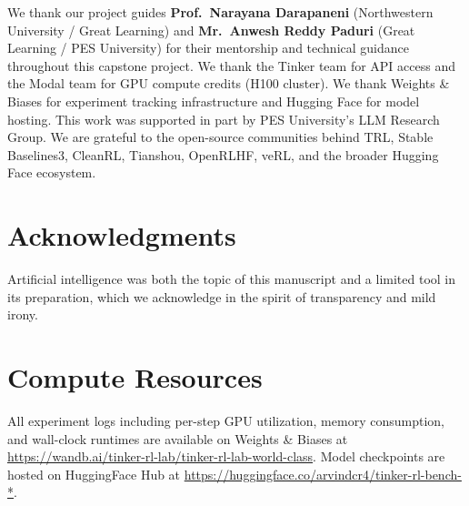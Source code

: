 \documentclass{article}
\begin{document}




\begin{ack}
\label{sec:acknowledgments}
We thank our project guides \textbf{Prof.~Narayana Darapaneni}
(Northwestern University / Great Learning) and
\textbf{Mr.~Anwesh Reddy Paduri} (Great Learning / PES University)
for their mentorship and technical guidance throughout this capstone project.
We thank the Tinker team for API access and the Modal team for GPU compute credits
(H100 cluster). We thank Weights \& Biases for experiment tracking infrastructure
and Hugging Face for model hosting. This work was supported in part by PES
University's LLM Research Group. We are grateful to the open-source communities
behind TRL, Stable Baselines3, CleanRL, Tianshou, OpenRLHF, veRL, and the
broader Hugging Face ecosystem.
\end{ack}




\section*{Acknowledgments}
Artificial intelligence was both the topic of this manuscript and a limited tool in its preparation, which we acknowledge in the spirit of transparency and mild irony.



\appendix

\section{Compute Resources}
\label{app:compute}

All experiment logs including per-step GPU utilization, memory consumption,
and wall-clock runtimes are available on Weights \& Biases at
\url{https://wandb.ai/tinker-rl-lab/tinker-rl-lab-world-class}.
Model checkpoints are hosted on HuggingFace Hub at
\url{https://huggingface.co/arvindcr4/tinker-rl-bench-*}.
\end{document}
